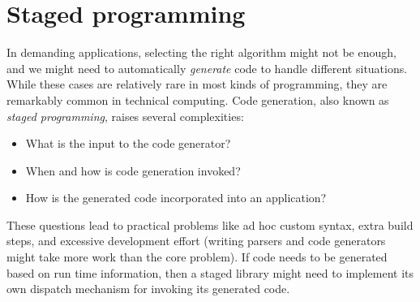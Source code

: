 



\section{Staged programming}

In demanding applications, selecting the right algorithm might not
be enough, and we might need to automatically \emph{generate} code
to handle different situations.
While these cases are relatively rare in most kinds of programming,
they are remarkably common in technical computing.
Code generation, also known as \emph{staged programming}, raises
several complexities:

\vspace{-3ex}
\begin{singlespace}
\begin{itemize}
\item What is the input to the code generator?
\item When and how is code generation invoked?
\item How is the generated code incorporated into an application?
\end{itemize}
\end{singlespace}

\noindent
These questions lead to practical problems like ad hoc custom syntax,
extra build steps, and excessive development effort (writing parsers and
code generators might take more work than the core problem).
If code needs to be generated based on run time information, then a
staged library might need to implement its own dispatch mechanism
for invoking its generated code.

